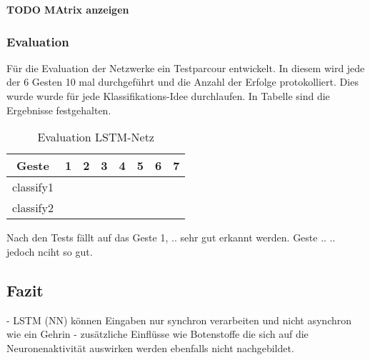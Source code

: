\textbf{TODO MAtrix anzeigen}

\subsubsection{Evaluation}
Für die Evaluation der Netzwerke ein Testparcour entwickelt. In diesem wird 
jede der 6 Gesten 10 mal durchgeführt und die Anzahl der Erfolge protokolliert. 
Dies wurde wurde für jede Klassifikations-Idee durchlaufen. In Tabelle 
\cite{tab:eval} sind die Ergebnisse festgehalten.
\begin{table}
\begin{tabular}{|c|c|c|c|c|c|c|c|}
\hline
 Geste 		& 1 & 2 & 3 & 4 & 5 & 6 & 7 \\
 \hline
 classify1  &	&	&	&	&	&	&	\\
 \hline
 classify2  &	&	&	&	&	&	&	\\
\hline
\end{tabular}
\caption{Evaluation LSTM-Netz}
\label{tab:eval}
\end{table}

Nach den Tests fällt auf das Geste 1, .. sehr gut erkannt werden. Geste .. ..
jedoch nciht so gut.
\subsection{Fazit}
- LSTM (NN) können Eingaben nur synchron verarbeiten und nicht asynchron wie ein
Gehrin
- zusätzliche Einflüsse wie Botenstoffe die sich auf die Neuronenaktivität
auswirken werden ebenfalls nicht nachgebildet. 

\nocite{schaul2010,GERS2001,WIKI2013,Schmidhuber2013,LSTM1,Nerbonne1}
